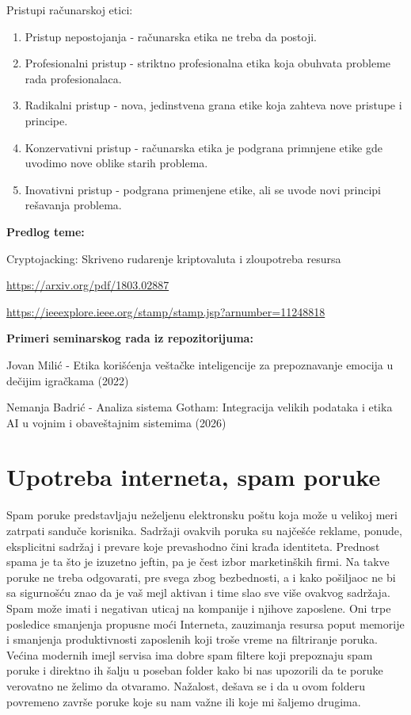 \documentclass{article}
\begin{document}
Pristupi računarskoj etici:

\begin{enumerate}[label=\arabic*.]
    \item Pristup nepostojanja - računarska etika ne treba da postoji.
    \item Profesionalni pristup - striktno profesionalna etika koja obuhvata probleme rada profesionalaca.
    \item Radikalni pristup - nova, jedinstvena grana etike koja zahteva nove pristupe i principe.
    \item Konzervativni pristup - računarska etika je podgrana primnjene etike gde uvodimo nove oblike starih problema.
    \item Inovativni pristup - podgrana primenjene etike, ali se uvode novi principi rešavanja problema.
\end{enumerate}

\textbf{Predlog teme:}

Cryptojacking: Skriveno rudarenje kriptovaluta i zloupotreba resursa

\url{https://arxiv.org/pdf/1803.02887}

\url{https://ieeexplore.ieee.org/stamp/stamp.jsp?arnumber=11248818}

\textbf{Primeri seminarskog rada iz repozitorijuma:}

Jovan Milić - Etika korišćenja veštačke inteligencije za prepoznavanje emocija u dečijim igračkama (2022)

Nemanja Badrić - Analiza sistema Gotham: Integracija velikih podataka i etika AI u vojnim i obaveštajnim sistemima (2026)

\section{Upotreba interneta, spam poruke}

Spam poruke predstavljaju neželjenu elektronsku poštu koja može u velikoj meri zatrpati sanduče korisnika. Sadržaji ovakvih poruka su najčešće reklame, ponude, eksplicitni sadržaj i prevare koje prevashodno čini krađa identiteta. Prednost spama je ta što je izuzetno jeftin, pa je čest izbor marketinških firmi. Na takve poruke ne treba odgovarati, pre svega zbog bezbednosti, a i kako pošiljaoc ne bi sa sigurnošću znao da je vaš mejl aktivan i time slao sve više ovakvog sadržaja. Spam može imati i negativan uticaj na kompanije i njihove zaposlene. Oni trpe posledice smanjenja propusne moći Interneta, zauzimanja resursa poput memorije i smanjenja produktivnosti zaposlenih koji troše vreme na filtriranje poruka.
Većina modernih imejl servisa ima dobre spam filtere koji prepoznaju spam poruke i direktno ih šalju u poseban folder kako bi nas upozorili da te poruke verovatno ne želimo da otvaramo. Nažalost, dešava se i da u ovom folderu povremeno završe poruke koje su nam važne ili koje mi šaljemo drugima.
\end{document}
